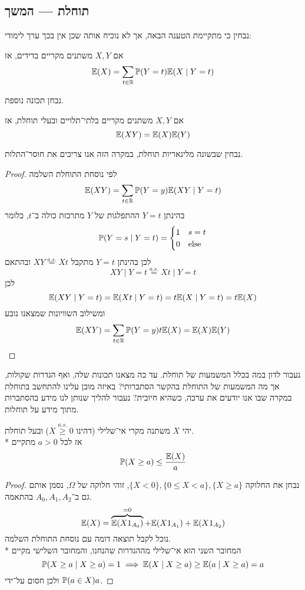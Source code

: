 \subsection{תוחלת --- המשך}
נבחין כי מתקיימת הטענה הבאה, אך לא נוכיח אותה שכן אין בכך ערך לימודי:
\begin{proposition}
	אם $X, Y$ משתנים מקריים בדידים, אז
	\[
		\mathbb{E}(X) = \sum_{t \in \mathbb{R}} \mathbb{P}(Y = t) \mathbb{E}(X \mid Y = t)
	\]
\end{proposition}
נבחן תכונה נוספת.
\begin{proposition}
	אם $X, Y$ משתנים מקריים בלתי־תלויים ובעלי תוחלת, אז
	\[
		\mathbb{E}(X Y) = \mathbb{E}(X) \mathbb{E}(Y)
	\]
\end{proposition}
נבחין שבשונה מלינאריות תוחלת, במקרה הזה אנו צריכים את חוסר־התלות.
\begin{proof}
	לפי נוסחת התוחלת השלמה
	\[
		\mathbb{E}(XY) = \sum_{t \in \mathbb{R}} \mathbb{P}(Y = y) \mathbb{E}(XY \mid Y = t)
	\]
	בהינתן $Y = t$ ההתפלגות של $Y$ מתרכזת כולה ב־$t$, כלומר
	\[
		\mathbb{P}(Y = s \mid Y = t) = \begin{cases}
			1 & s = t \\
			0 & \text{else}
		\end{cases}
	\]
	לכן בהינתן $Y = t$ מתקבל $XY \overset{a.s.}{=} Xt$ ובהתאם
	\[
		XY \mid Y = t \overset{a.s.}{=} Xt \mid Y = t
	\]
	לכן
	\[
		\mathbb{E}(XY \mid Y = t)
		= \mathbb{E}(Xt \mid Y = t)
		= t \mathbb{E}(X \mid Y = t)
		= t \mathbb{E}(X)
	\]
	ומשילוב השוויונות שמצאנו נובע
	\[
		\mathbb{E}(XY)
		= \sum_{t \in \mathbb{R}} \mathbb{P}(Y = y) t \mathbb{E}(X)
		= \mathbb{E}(X) \mathbb{E}(Y)
	\]
\end{proof}
נעבור לדון במה בכלל המשמעות של תוחלת.
עד כה מצאנו תכונות שלה, ואף הגדרות שקולות, אך מה המשמעות של התוחלת בהקשר הסתברותי?
באיזה מובן עלינו להתחשב בתוחלת במקרה שבו אנו יודעים את ערכה, כשהיא חיובית?
נעבור להליך שנותן לנו מידע בהסתברות מתוך מידע על תוחלות.
\begin{theorem}
	יהי $X$ משתנה מקרי אי־שלילי (דהינו $X \overset{a.s.}{\ge} 0$) ובעל תוחלת. \\*
	אז לכל $a > 0$ מתקיים
	\[
		\mathbb{P}(X \ge a) \le \frac{\mathbb{E}(X)}{a}
	\]
\end{theorem}
\begin{proof}
	נבחן את החלוקה $\{X < 0\}, \{0 \le X < a\}, \{X \ge a\}$, זוהי חלוקה של $\Omega$, נסמן אותם גם ב־$A_0, A_1, A_2$ בהתאמה.
	\[
		\mathbb{E}(X) = \overbrace{\mathbb{E}(X 1_{A_0})}^{=0} + \mathbb{E}(X 1_{A_1}) + \mathbb{E}(X 1_{A_2})
	\]
	נוכל לקבל תוצאה דומה עם נוסחת התוחלת השלמה. \\*
	המחובר השני הוא אי־שלילי מההגדרות שהנחנו, והמחובר השלישי מקיים
	\[
		\mathbb{P}(X \ge a \mid X \ge a) = 1
		\implies \mathbb{E}(X \mid X \ge a) \ge \mathbb{E}(a \mid X \ge a) = a
	\]
	ולכן חסום על־ידי $\mathbb{P}(a \in X) a$.
\end{proof}

